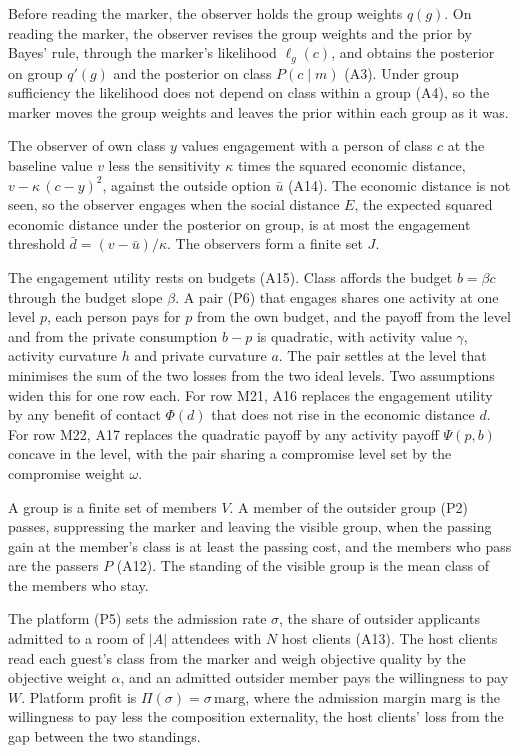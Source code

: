 Before reading the marker, the observer holds the group weights $q(g)$. On
reading the marker, the observer revises the group weights and the prior
by Bayes' rule, through the marker's likelihood $\ell_g(c)$, and obtains
the posterior on group $q'(g)$ and the posterior on class $P(c\mid m)$
(A3). Under group sufficiency the likelihood does not depend on class
within a group (A4), so the marker moves the group weights and leaves the
prior within each group as it was.

The observer of own class $y$ values engagement with a person of class $c$
at the baseline value $v$ less the sensitivity $\kappa$ times the squared
economic distance, $v-\kappa\,(c-y)^2$, against the outside option $\bar u$
(A14). The economic distance is not seen, so the observer engages when the
social distance $E$, the expected squared economic distance under the
posterior on group, is at most the engagement threshold
$\bar d=(v-\bar u)/\kappa$. The observers form a finite set $J$.

The engagement utility rests on budgets (A15). Class affords the budget
$b=\beta c$ through the budget slope $\beta$. A pair (P6) that engages
shares one activity at one level $p$, each person pays for $p$ from the own
budget, and the payoff from the level and from the private consumption
$b-p$ is quadratic, with activity value $\gamma$, activity curvature $h$
and private curvature $a$. The pair settles at the level that minimises the
sum of the two losses from the two ideal levels. Two assumptions widen
this for one row each. For row M21, A16 replaces the engagement utility by
any benefit of contact $\Phi(d)$ that does not rise in the economic
distance $d$. For row M22, A17 replaces the quadratic payoff by any
activity payoff $\Psi(p,b)$ concave in the level, with the pair sharing a
compromise level set by the compromise weight $\omega$.

A group is a finite set of members $V$. A member of the outsider group (P2)
passes, suppressing the marker and leaving the visible group, when the
passing gain at the member's class is at least the passing cost, and the
members who pass are the passers $P$ (A12). The standing of the visible
group is the mean class of the members who stay.

The platform (P5) sets the admission rate $\sigma$, the share of outsider
applicants admitted to a room of $|A|$ attendees with $N$ host clients
(A13). The host clients read each guest's class from the marker and weigh
objective quality by the objective weight $\alpha$, and an admitted outsider
member pays the willingness to pay $W$. Platform profit is
$\Pi(\sigma)=\sigma\,\mathrm{marg}$, where the admission margin
$\mathrm{marg}$ is the willingness to pay less the composition externality,
the host clients' loss from the gap between the two standings.

